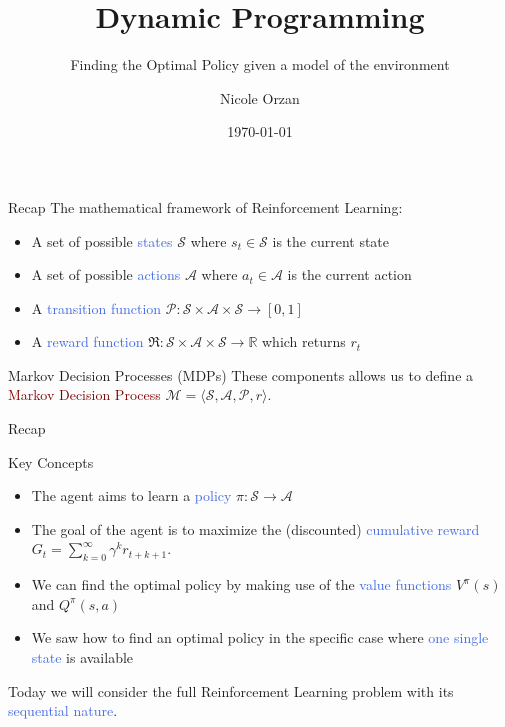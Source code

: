 \documentclass{beamer}
\title{Dynamic Programming}
\subtitle{Finding the Optimal Policy given a model of the environment}
\author{Nicole Orzan}
\date{\today}
\begin{document}
\frame{\titlepage} 


\begin{frame}{Recap}
	The mathematical framework of Reinforcement Learning:
	\begin{itemize}
		\item A set of possible \textcolor{RoyalBlue}{states} $\mathcal{S}$ where $s_t\in\mathcal{S}$ is the current state
		\item A set of possible \textcolor{RoyalBlue}{actions} $\mathcal{A}$ where $a_t\in\mathcal{A}$ is the current action
		\item A \textcolor{RoyalBlue}{transition function} $\mathcal{P}:\mathcal{S}\times\mathcal{A}\times\mathcal{S}\rightarrow[0,1]$
		\item A \textcolor{RoyalBlue}{reward function} $\Re:\mathcal{S}\times\mathcal{A}\times\mathcal{S}\rightarrow \mathbb{R}$ which returns $r_t$
	\end{itemize}

	\vspace{1mm}
	\begin{block}{Markov Decision Processes (MDPs)}
		These components allows us to define a \textcolor{Maroon}{Markov Decision Process} 
		\centering $\mathcal{M}=\langle \mathcal{S},\mathcal{A},\mathcal{P},r\rangle$.
	\end{block}

\end{frame}


\begin{frame}{Recap}

\begin{block}{Key Concepts}
\begin{itemize}
	\item The agent aims to learn a \textcolor{RoyalBlue}{policy} $\pi: \mathcal{S}\rightarrow \mathcal{A}$
	\item The goal of the agent is to maximize the (discounted) \textcolor{RoyalBlue}{cumulative reward} $G_t = \sum_{k=0}^{\infty}\gamma^{k} r_{t+k+1}$.
	\item We can find the optimal policy by making use of the \textcolor{RoyalBlue}{value functions} $V^\pi(s)$ and $Q^\pi(s,a)$ 
	\item We saw how to find an optimal policy in the specific case where \textcolor{RoyalBlue}{one single state} is available
\end{itemize}
\end{block}

\vspace{2mm}

	Today we will consider the full Reinforcement Learning problem with its \textcolor{RoyalBlue}{sequential nature}.
	
\end{frame}
\end{document}
